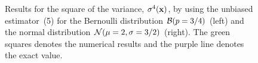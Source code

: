 \documentclass[a4paper]{article}
\begin{document}
\begin{figure}
  \begin{center}
  \end{center}
  \caption{Results for the square of the variance, $\sigma^4({\bf x})$, by using the unbiased estimator~(5) for the Bernoulli distribution ${\cal B}(p=3/4)$ (left) and the normal distribution ${\cal N}(\mu=2,\sigma=3/2)$ (right). The green squares denotes the numerical results and the purple line denotes the exact value.}
\end{figure}
\end{document}
